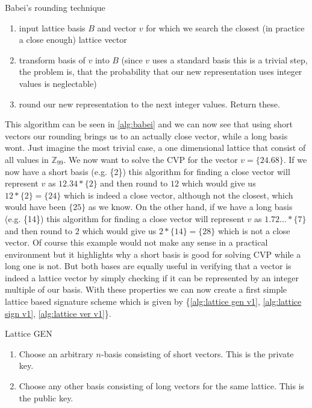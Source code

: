 \documentclass[conference]{IEEEtran}
\begin{document}
\begin{algorithm}
    \caption{Babei's rounding technique}\label{alg:babei}
        \begin{enumerate}
            \item input lattice basis $B$ and vector $v$ for which we search the closest (in practice a close enough) lattice vector
            \item transform basis of $v$ into $B$ (since $v$ uses a standard basis this is a trivial step, the problem is, that the probability that our new representation uses integer values is neglectable)
            \item round our new representation to the next integer values. Return these.
        \end{enumerate}
    \end{algorithm}

This algorithm can be seen in \ref{alg:babei} and we can now see that using short vectors our rounding brings us to an actually close vector, while a long basis wont.
Just imagine the most trivial case, a one dimensional lattice that consist of all values in $\mathbb{Z}_99$. We now want to solve the CVP for the vector $v= \{24.68\}$.
If we now have a short basis (e.g. \{2\}) this algorithm for finding a close vector will represent $v$ as $12.34*\{2\}$ and then round to $12$ which would give us $12*\{2\}=\{24\}$ which is indeed a close vector, although not the closest, which would have been $\{25\}$ as we know.
On the other hand, if we have a long basis (e.g. \{14\}) this algorithm for finding a close vector will represent $v$ as $1.72\dots*\{7\}$ and then round to $2$ which would give us $2*\{14\}=\{28\}$ which is not a close vector.
Of course this example would not make any sense in a practical environment but it highlights why a short basis is good for solving CVP while a long one is not.
But both bases are equally useful in verifying that a vector is indeed a lattice vector by simply checking if it can be represented by an integer multiple of our basis.
With these properties we can now create a first simple lattice based signature scheme which is given by \{\ref{alg:lattice gen v1}, \ref{alg:lattice sign v1}, \ref{alg:lattice ver v1}\}.

\begin{algorithm}
    \caption{Lattice GEN}\label{alg:lattice gen v1}
        \begin{enumerate}
            \item Choose an arbitrary $n$-basis consisting of short vectors. This is the private key.
            \item Choose any other basis consisting of long vectors for the same lattice. This is the public key. %
        \end{enumerate}
    \end{algorithm}
\end{document}
